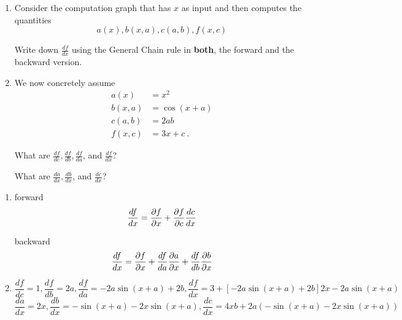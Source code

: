 

\renewcommand{\course}{Artificial Intelligence}
\renewcommand{\coursepicture}{course_ai}
\renewcommand{\coursedate}{Summer 2026}

\renewcommand{\exnum}{Exercise 1}
\renewcommand{\teacher}{Sayantan Auddy}
\exercises
\exercisestitle



\begin{enumerate}
\item Consider the computation graph that has $x$ as input and then computes
the quantities
$$ a(x), b(x,a), c(a,b), f(x,c) $$

Write down $\frac{df}{dx}$ using the General Chain rule in \textbf{both}, the forward and the backward version.

\item We now concretely assume
%
\begin{align*}
a(x) &= x^2 \\
b(x,a) &= \cos(x+a) \\
c(a,b) &= 2ab \\
f(x,c) &= 3x + c ~.
\end{align*}

What are $\frac{df}{dc}, \frac{df}{db}, \frac{df}{da}$, and $\frac{df}{dx}$? 

What are $\frac{da}{dx}, \frac{db}{dx}$, and $\frac{dc}{dx}$?
\end{enumerate}

\begin{solution}
\begin{enumerate}
\item forward
$$\frac{df}{dx} = \frac{\partial f}{\partial x} + \frac{\partial f}{\partial c} \frac{d c}{d x} $$

backward
$$\frac{df}{dx} = \frac{\partial f}{\partial x} + \frac{d f}{d a} \frac{\partial a}{\partial x} + \frac{d f}{d b} \frac{\partial b}{\partial x} $$

\item

$$\frac{df}{dc} = 1\comma \frac{df}{db} = 2a\comma  \frac{df}{da} = -2a \sin(x+a) + 2b \comma \frac{df}{dx} = 3 + [-2a \sin(x+a) + 2b] 2x - 2a\sin(x+a)$$
$$\frac{da}{dx} = 2x\comma \frac{db}{dx} = -\sin(x+a)-2x\sin(x+a)\comma \frac{dc}{dx} = 4xb + 2a(-\sin(x+a)-2x\sin(x+a))$$
\end{enumerate}
\end{solution}


